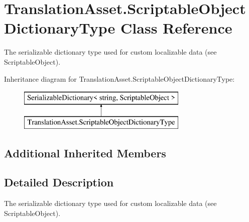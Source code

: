 \hypertarget{class_translation_asset_1_1_scriptable_object_dictionary_type}{}\section{Translation\+Asset.\+Scriptable\+Object\+Dictionary\+Type Class Reference}
\label{class_translation_asset_1_1_scriptable_object_dictionary_type}


The serializable dictionary type used for custom localizable data (see Scriptable\+Object).  


Inheritance diagram for Translation\+Asset.\+Scriptable\+Object\+Dictionary\+Type\+:\begin{figure}[H]
\begin{center}
\leavevmode
\includegraphics[height=2.000000cm]{class_translation_asset_1_1_scriptable_object_dictionary_type}
\end{center}
\end{figure}
\subsection*{Additional Inherited Members}


\subsection{Detailed Description}
The serializable dictionary type used for custom localizable data (see Scriptable\+Object). 

